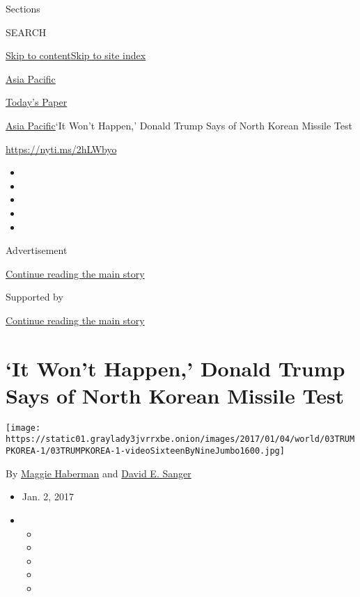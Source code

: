 Sections

SEARCH

\protect\hyperlink{site-content}{Skip to
content}\protect\hyperlink{site-index}{Skip to site index}

\href{https://www.nytimes3xbfgragh.onion/section/world/asia}{Asia
Pacific}

\href{https://myaccount.nytimes3xbfgragh.onion/auth/login?response_type=cookie\&client_id=vi}{}

\href{https://www.nytimes3xbfgragh.onion/section/todayspaper}{Today's
Paper}

\href{/section/world/asia}{Asia Pacific}\textbar{}`It Won't Happen,'
Donald Trump Says of North Korean Missile Test

\url{https://nyti.ms/2hLWbyo}

\begin{itemize}
\item
\item
\item
\item
\item
\end{itemize}

Advertisement

\protect\hyperlink{after-top}{Continue reading the main story}

Supported by

\protect\hyperlink{after-sponsor}{Continue reading the main story}

\hypertarget{it-wont-happen-donald-trump-says-of-north-korean-missile-test}{%
\section{`It Won't Happen,' Donald Trump Says of North Korean Missile
Test}\label{it-wont-happen-donald-trump-says-of-north-korean-missile-test}}

\texttt{[image: https://static01.graylady3jvrrxbe.onion/images/2017/01/04/world/03TRUMPKOREA-1/03TRUMPKOREA-1-videoSixteenByNineJumbo1600.jpg]}

By \href{http://www.nytimes3xbfgragh.onion/by/maggie-haberman}{Maggie
Haberman} and
\href{http://www.nytimes3xbfgragh.onion/by/david-e-sanger}{David E.
Sanger}

\begin{itemize}
\item
  Jan. 2, 2017
\item
  \begin{itemize}
  \item
  \item
  \item
  \item
  \item
  \end{itemize}
\end{itemize}

